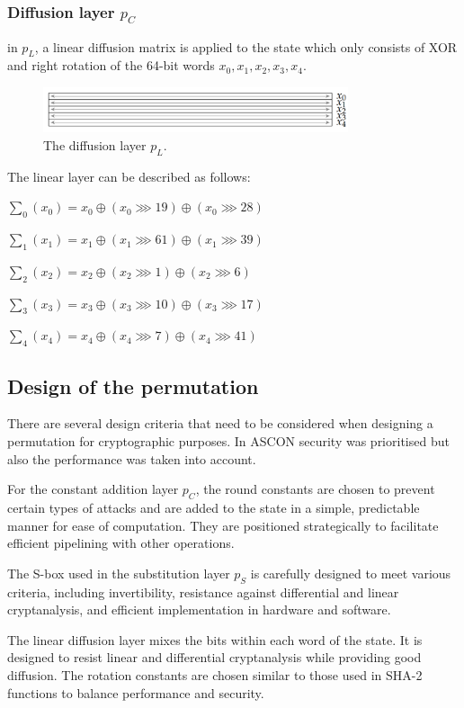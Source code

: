 \subsubsection{Diffusion layer $p_C$}
in $p_L$, a linear diffusion matrix is applied to the state which only consists of XOR and right rotation of the 64-bit words $x_0, x_1, x_2, x_3, x_4$. \cite{ascon_specification, analysis_of_ascon}

\begin{figure}[htbp]
  \centering
  \includegraphics[width=0.8\textwidth]{images/diffusion.png}
  \caption{The diffusion layer $p_L$.}
  \label{fig:diffusion}
\end{figure}

The linear layer can be described as follows:


$\sum_0 (x_0) = x_0 \oplus (x_0 \ggg 19) \oplus (x_0 \ggg 28)$

$\sum_1 (x_1) = x_1 \oplus (x_1 \ggg 61) \oplus (x_1 \ggg 39)$

$\sum_2 (x_2) = x_2 \oplus (x_2 \ggg 1) \oplus (x_2 \ggg 6)$

$\sum_3 (x_3) = x_3 \oplus (x_3 \ggg 10) \oplus (x_3 \ggg 17)$

$\sum_4 (x_4) = x_4 \oplus (x_4 \ggg 7) \oplus (x_4 \ggg 41)$ 

\cite{ascon_specification,analysis_of_ascon}


\subsection{Design of the permutation}

There are several design criteria that need to be considered when designing a permutation for cryptographic purposes. In ASCON security was prioritised but also the performance was taken into account. \par

For the constant addition layer $p_C$, the round constants are chosen to prevent certain types of attacks and are added to the state in a simple, predictable manner for ease of computation. They are positioned strategically to facilitate efficient pipelining with other operations. \par

The S-box used in the substitution layer $p_S$ is carefully designed to meet various criteria, including invertibility, resistance against differential and linear cryptanalysis, and efficient implementation in hardware and software. \par

The linear diffusion layer mixes the bits within each word of the state. It is designed to resist linear and differential cryptanalysis while providing good diffusion. The rotation constants are chosen similar to those used in SHA-2 functions to balance performance and security. \par

\cite{DBLP:journals/joc/DobraunigEMS21}

\printbibliography
